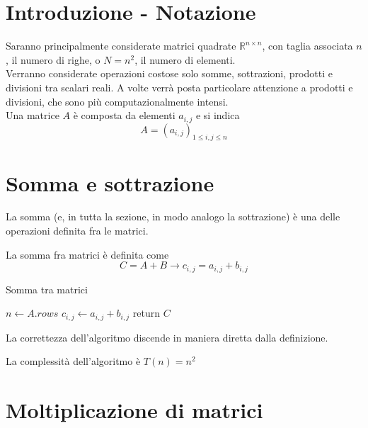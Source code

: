 \section{Introduzione - Notazione}
Saranno principalmente considerate matrici quadrate $\mathbb{R}^{n \times n}$, con taglia associata $n$, il numero di righe, o $N=n^2$, il numero di elementi.\\
Verranno considerate operazioni costose solo somme, sottrazioni, prodotti e divisioni tra scalari reali. A volte verrà posta particolare attenzione a prodotti e divisioni, che sono più computazionalmente intensi.\\
Una matrice $A$ è composta da elementi $a_{i,j}$ e si indica
\[ A = \left( a_{i,j} \right)_{1 \leq i,j \leq n} \]

\section{Somma e sottrazione}
La somma (e, in tutta la sezione, in modo analogo la sottrazione) è una delle operazioni definita fra le matrici.
\begin{definition}
    La somma fra matrici è definita come
    \[
    C = A + B \rightarrow
    c_{i,j} = a_{i,j} + b_{i,j}
    \]
    \label{def:somma}
\end{definition}
\begin{algorithm}[H]
\caption{Somma tra matrici}\label{alg:sum}
\begin{algorithmic}[1]
    \State $n \gets A.rows$
                \State $c_{i,j} \gets a_{i,j} + b_{i,j} $
            \EndFor
        \EndFor
    \State return $C$
\EndProcedure
\end{algorithmic}
\end{algorithm}
La correttezza dell'algoritmo discende in maniera diretta dalla definizione.

La complessità dell'algoritmo è $T(n) = n^2$

\section{Moltiplicazione di matrici}
